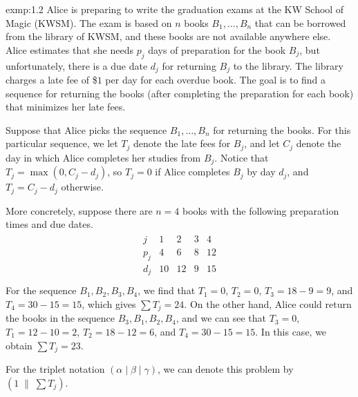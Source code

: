 \begin{exmp}{exmp:1.2}
    Alice is preparing to write the graduation exams at the KW School of 
    Magic (KWSM). The exam is based on $n$ books $B_1, \dots, B_n$ that 
    can be borrowed from the library of KWSM, and these books are not 
    available anywhere else. Alice estimates that she needs $p_j$ days of 
    preparation for the book $B_j$, but unfortunately, there is a due 
    date $d_j$ for returning $B_j$ to the library. The library charges 
    a late fee of \$$1$ per day for each overdue book. The goal is to 
    find a sequence for returning the books (after completing the 
    preparation for each book) that minimizes her late fees. 

    Suppose that Alice picks the sequence $B_1, \dots, B_n$ for 
    returning the books. For this particular sequence, we let 
    $T_j$ denote the late fees for $B_j$, and let $C_j$ denote the day 
    in which Alice completes her studies from $B_j$. Notice that 
    $T_j = \max(0, C_j - d_j)$, so $T_j = 0$ if Alice completes $B_j$ 
    by day $d_j$, and $T_j = C_j - d_j$ otherwise. 

    More concretely, suppose there are $n = 4$ books with the 
    following preparation times and due dates. 
    \begin{align*}
        \begin{array}{c|cccc}
            j   & 1  & 2  & 3 & 4  \\ \hline
            p_j & 4  & 6  & 8 & 12 \\
            d_j & 10 & 12 & 9 & 15 \\
        \end{array}
    \end{align*}
    For the sequence $B_1, B_2, B_3, B_4$, we find that $T_1 = 0$, 
    $T_2 = 0$, $T_3 = 18 - 9 = 9$, and $T_4 = 30 - 15 = 15$, which gives 
    $\sum T_j = 24$. On the other hand, Alice could return the books 
    in the sequence $B_3, B_1, B_2, B_4$, and we can see that 
    $T_3 = 0$, $T_1 = 12 - 10 = 2$, $T_2 = 18 - 12 = 6$, and $T_4
    = 30 - 15 = 15$. In this case, we obtain $\sum T_j = 23$. 

    For the triplet notation $(\alpha \mid \beta \mid \gamma)$, we can 
    denote this problem by $(1\;\|\;\sum T_j)$. 
\end{exmp}

